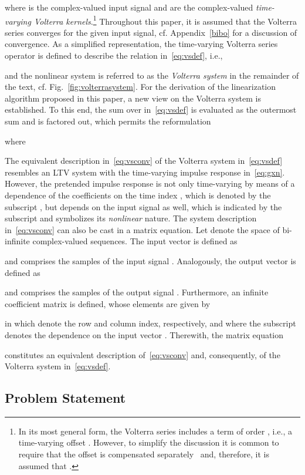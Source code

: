 \documentclass[10pt,twocolumn,twoside]{IEEEtran}
\begin{document}
where  is the complex-valued input signal and  are the
complex-valued \emph{time-varying Volterra
kernels}.\footnote{In its most general form, the Volterra series includes a term of order ,
i.e., a time-varying offset . However, to simplify the discussion it is common
to require that the offset is compensated separately~\cite{mathews1991} and, therefore,
it is assumed that .} Throughout this paper, it is assumed that the Volterra series
converges for the given input signal, cf. Appendix~\ref{bibo} for a discussion of convergence.
As a simplified representation, the time-varying Volterra series operator  is defined
to describe the relation in~\eqref{eq:vsdef}, i.e.,

and the nonlinear system is referred to as the \emph{Volterra system}  in the remainder
of the text, cf. Fig.~\ref{fig:volterrasystem}.
For the derivation of the linearization algorithm proposed in this paper,
a new view on the Volterra system is established.
To this end, the sum over  in~\eqref{eq:vsdef} is evaluated as the outermost
sum and  is factored out, which permits the reformulation

where

The equivalent description in~\eqref{eq:vsconv} of the Volterra system
in~\eqref{eq:vsdef} resembles an LTV system with the time-varying impulse response
in~\eqref{eq:gxn}. However, the pretended impulse response  is not only time-varying
by means of a dependence of the coefficients on the time index , which is denoted by
the subscript , but depends on the input signal  as well, which is indicated by
the subscript  and symbolizes its \emph{nonlinear} nature.
The system description in~\eqref{eq:vsconv} can also be
cast in a matrix equation. Let  denote the space of bi-infinite
complex-valued sequences. The input vector  is defined as

and comprises the samples of the input signal .
Analogously, the output vector  is defined as

and comprises the samples of the output signal . Furthermore, an infinite
coefficient matrix  is defined,
whose elements  are given by

in which  denote the row and column index, respectively, and
where the subscript  denotes the dependence on the input vector .
Therewith, the matrix equation

constitutes an equivalent description of~\eqref{eq:vsconv} and, consequently,
of the Volterra system  in~\eqref{eq:vsdef}.

\subsection{Problem Statement}
	\label{model:problem}
\end{document}
